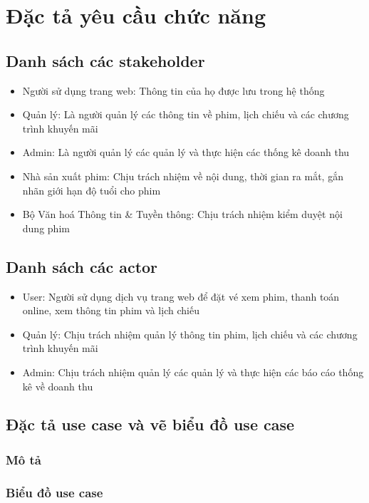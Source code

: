 \documentclass[a4paper, 12pt]{article}
\begin{document}
    \section{Đặc tả yêu cầu chức năng}
    \label{sec:describeFunction}

    \subsection{Danh sách các stakeholder}
    \begin{itemize}
        \item Người sử dụng trang web: Thông tin của họ được lưu trong hệ thống
        \item Quản lý: Là người quản lý các thông tin về phim, lịch chiếu và các chương trình khuyến mãi
        \item Admin: Là người quản lý các quản lý và thực hiện các thống kê doanh thu 
        \item Nhà sản xuất phim: Chịu trách nhiệm về nội dung, thời gian ra mắt, gắn nhãn giới hạn độ tuổi cho phim
        \item Bộ Văn hoá Thông tin \& Tuyền thông: Chịu trách nhiệm kiểm duyệt nội dung phim
    \end{itemize}

    \subsection{Danh sách các actor}
    \begin{itemize}
        \item User: Người sử dụng dịch vụ trang web để đặt vé xem phim, thanh toán online, xem thông tin phim và lịch chiếu
        \item Quản lý: Chịu trách nhiệm quản lý thông tin phim, lịch chiếu và các chương trình khuyến mãi
        \item Admin: Chịu trách nhiệm quản lý các quản lý và thực hiện các báo cáo thống kê về doanh thu 
    \end{itemize}

    \subsection{Đặc tả use case và vẽ biểu đồ use case}
    \subsubsection{Mô tả}
    \subsubsection{Biểu đồ use case}
\end{document}
